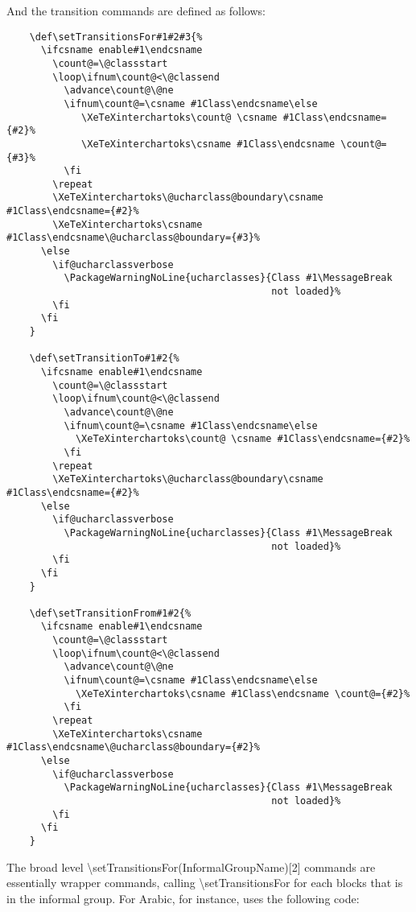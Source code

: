 \documentclass{article}
\begin{document}
    And the transition commands are defined as follows:

    \disableTransitionRules
    \begin{verbatim}
    \def\setTransitionsFor#1#2#3{%
      \ifcsname enable#1\endcsname
        \count@=\@classstart
        \loop\ifnum\count@<\@classend
          \advance\count@\@ne
          \ifnum\count@=\csname #1Class\endcsname\else
             \XeTeXinterchartoks\count@ \csname #1Class\endcsname={#2}%
             \XeTeXinterchartoks\csname #1Class\endcsname \count@={#3}%
          \fi
        \repeat
        \XeTeXinterchartoks\@ucharclass@boundary\csname #1Class\endcsname={#2}%
        \XeTeXinterchartoks\csname #1Class\endcsname\@ucharclass@boundary={#3}%
      \else
        \if@ucharclassverbose
          \PackageWarningNoLine{ucharclasses}{Class #1\MessageBreak
                                              not loaded}%
        \fi
      \fi
    }

    \def\setTransitionTo#1#2{%
      \ifcsname enable#1\endcsname
        \count@=\@classstart
        \loop\ifnum\count@<\@classend
          \advance\count@\@ne
          \ifnum\count@=\csname #1Class\endcsname\else
            \XeTeXinterchartoks\count@ \csname #1Class\endcsname={#2}%
          \fi
        \repeat
        \XeTeXinterchartoks\@ucharclass@boundary\csname #1Class\endcsname={#2}%
      \else
        \if@ucharclassverbose
          \PackageWarningNoLine{ucharclasses}{Class #1\MessageBreak
                                              not loaded}%
        \fi
      \fi
    }

    \def\setTransitionFrom#1#2{%
      \ifcsname enable#1\endcsname
        \count@=\@classstart
        \loop\ifnum\count@<\@classend
          \advance\count@\@ne
          \ifnum\count@=\csname #1Class\endcsname\else
            \XeTeXinterchartoks\csname #1Class\endcsname \count@={#2}%
          \fi
        \repeat
        \XeTeXinterchartoks\csname #1Class\endcsname\@ucharclass@boundary={#2}%
      \else
        \if@ucharclassverbose
          \PackageWarningNoLine{ucharclasses}{Class #1\MessageBreak
                                              not loaded}%
        \fi
      \fi
    }
    \end{verbatim}
    \enableTransitionRules

    The broad level \textbackslash setTransitionsFor(InformalGroupName)[2] commands are essentially wrapper commands, calling \textbackslash setTransitionsFor for each blocks that is in the informal group. For Arabic, for instance, uses the following code:
\end{document}
